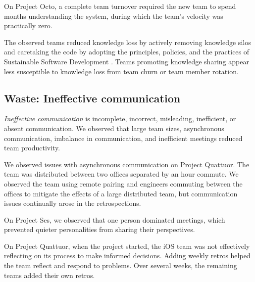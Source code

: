 On Project Octo, a complete team turnover required the new team to spend months understanding the system, during which the team's velocity was practically zero.

The observed teams reduced knowledge loss by actively removing knowledge silos and caretaking the code by adopting the principles, policies, and the practices of Sustainable Software Development \cite{SedanoSustainableSoftware}. Teams promoting knowledge sharing appear less susceptible to knowledge loss from team churn or team member rotation. 

\subsection{Waste: Ineffective communication}
\textit{Ineffective communication} is incomplete, incorrect, misleading, inefficient, or absent communication. We observed that large team sizes, asynchronous communication, imbalance in communication, and inefficient meetings reduced team productivity.

We observed issues with asynchronous communication on Project Quattuor. The team was distributed between two offices separated by an hour commute. We observed the team using remote pairing and engineers commuting between the offices to mitigate the effects of a large distributed team, but communication issues continually arose in the retrospections.

On Project Ses, we observed that one person dominated meetings, which prevented quieter personalities from sharing their perspectives. 

On Project Quattuor, when the project started, the iOS team was not effectively reflecting on its process to make informed decisions. Adding weekly retros helped the team reflect and respond to problems. Over several weeks, the remaining teams added their own retros. 






